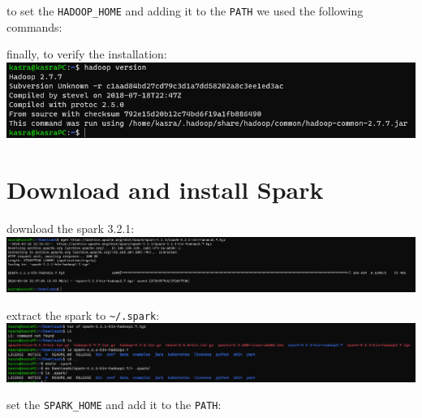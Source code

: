 \documentclass[
]{article}
\newenvironment{Shaded}{}{}
\newcommand{\BuiltInTok}[1]{#1}
\newcommand{\NormalTok}[1]{#1}
\newcommand{\VariableTok}[1]{\textcolor[rgb]{0.10,0.09,0.49}{#1}}
\begin{document}
to set the \texttt{HADOOP\_HOME} and adding it to the \texttt{PATH} we
used the following commands:

\begin{Shaded}
\end{Shaded}

finally, to verify the installation:\\
\includegraphics{image-1.png}

\hypertarget{download-and-install-spark}{%
\section{Download and install Spark}\label{download-and-install-spark}}

download the spark 3.2.1:\\
\includegraphics{image-3.png}

extract the spark to \texttt{\textasciitilde{}/.spark}:\\
\includegraphics{image-4.png}

set the \texttt{SPARK\_HOME} and add it to the \texttt{PATH}:

\begin{Shaded}
\end{Shaded}
\end{document}
